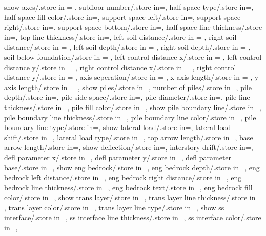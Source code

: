 {  show axes/.store in = \showaxes,
  subfloor number/.store in=\subfloors,
  half space type/.store in=\halfspacetype,
  half space fill color/.store in=\halfspacefillcolor,
  support space left/.store in=\hsdistleft,
  support space right/.store in=\hsdistright,
  support space bottom/.store in=\hsdistbottom,
  half space line thickness/.store in=\hsinnerlinethk,
  top line thickness/.store in=\thinlinethk,
  left soil distance/.store in = \leftsoildist,
  right soil distance/.store in = \rightsoildist,
  left soil depth/.store in = \leftsoildepth,
  right soil depth/.store in = \rightsoildepth,
  soil below foundation/.store in = \soilbelowfound,
  left control distance x/.store in = \leftcontrolx,
  left control distance y/.store in = \leftcontroly,
  right control distance x/.store in = \rightcontrolx,
  right control distance y/.store in = \rightcontroly,
  axis seperation/.store in = \axisseperation,
  x axis length/.store in = \axeslenX,
  y axis length/.store in = \axeslenY,
  show piles/.store in=\showpiles,
  number of piles/.store in=\numberofpiles,
  pile depth/.store in=\piledepth,
  pile side space/.store in=\pilesidespace,
  pile diameter/.store in=\pilediameter,
  pile line thickness/.store in=\pilelinethickness,
  pile fill color/.store in=\pilefillcolor,
  show pile boundary line/.store in=\showpbline,
  pile boundary line thickness/.store in=\pblinet,
  pile boundary line color/.store in=\pblinecolor,
  pile boundary line type/.store in=\pblinetype,
  show lateral load/.store in=\showlatload,
  lateral load shift/.store in=\latloadshift,
  lateral load type/.store in=\latloadtype,
  top arrow length/.store in=\toparrlen,
  base arrow length/.store in=\basearrlen,
  show deflection/.store in=\showdefl, 
  interstory drift/.store in=\drift,
  defl parameter x/.store in=,
  defl parameter y/.store in=,
  defl parameter base/.store in=,
  show eng bedrock/.store in=\showengbedrock,
  eng bedrock depth/.store in=\engbedrockdepth,
  eng bedrock left distance/.store in=\engbedrockleftdist,
  eng bedrock right distance/.store in=\engbedrockrightdist,
  eng bedrock line thickness/.store in=\engbedrocklinewidth,
  eng bedrock text/.store in=\engbedrocktext,
  eng bedrock fill color/.store in=\engbedrockfillcolor,
  show trans layer/.store in=\showtranslayer,
  trans layer line thickness/.store in= \translayerlinet,
  trans layer color/.store in=\translayercolor,
  trans layer line type/.store in=\translayerlinetype,
  show ss interface/.store in=\showssinter,
  ss interface line thickness/.store in=\ssinterlinet,
  ss interface color/.store in=\ssintercolor,
}
